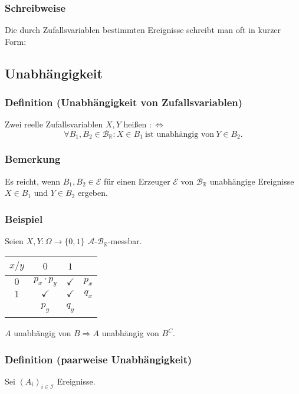 \subsubsection{Schreibweise}
Die durch Zufallsvariablen bestimmten Ereignisse schreibt man oft in kurzer Form:
\subsection{Unabh\"angigkeit}
\subsubsection{Definition (Unabh\"angigkeit von Zufallsvariablen)}
Zwei reelle Zufallsvariablen $X,Y$ hei\ss{}en  $:\Leftrightarrow$
\[\forall B_1,B_2\in\mathcal{B}_\mathbb{R}\colon X\in B_1\ \text{ist unabh\"angig von}\ Y\in B_2.\]
\subsubsection{Bemerkung}
Es reicht, wenn $B_1,B_2\in\mathcal{E}$ f\"ur einen Erzeuger $\mathcal{E}$ von $\mathcal{B}_\mathbb{R}$ unabh\"angige Ereignisse $X\in B_1$ und $Y\in B_2$ ergeben.
\subsubsection{Beispiel}
Seien $X,Y\colon\Omega\to\{0,1\}$ $\mathcal{A}$-$\mathcal{B}_\mathbb{R}$-messbar.
\begin{center}
\begin{tabular}{c|c|c|c}
$x/y$&$0$&$1$&~\\
\hline
$0$&$p_x\cdot p_y$&$\checkmark$&$p_x$\\
\hline
$1$&$\checkmark$&$\checkmark$&$q_x$\\
\hline
~&$p_y$&$q_y$&~
\end{tabular}
\end{center}
$A$ unabh\"angig von $B\Rightarrow A$ unabh\"angig von $B^C$.
\subsubsection{Definition (paarweise Unabh\"angigkeit)}
Sei $(A_i)_{i\in\mathcal{I}}$ Ereignisse.
